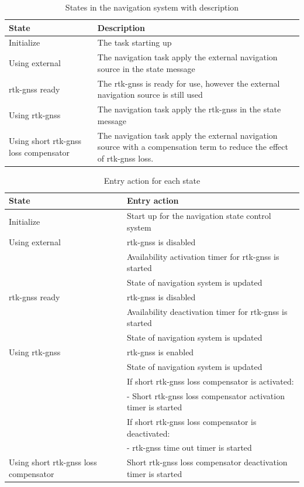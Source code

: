 \begin{table}[H]
\begin{tabular}{ | p{3cm} | p{8cm} |}
	\hline 
	\textbf{State}						& \textbf{Description} \\ \hline
	Initialize							& The task starting up\\ \hline
	Using external						& The navigation task apply the external navigation source in the state message\\ \hline
	\gls{rtk-gnss} ready							& The \gls{rtk-gnss} is ready for use, however the external navigation source is still used\\ \hline
	Using \gls{rtk-gnss}							& The navigation task apply the \gls{rtk-gnss} in the state message\\ \hline
	Using short \gls{rtk-gnss} loss compensator	& The navigation task apply the external navigation source with a compensation term to reduce the effect of \gls{rtk-gnss} loss. \\ \hline
\end{tabular}
\caption{States in the navigation system with description}
\label{Tb:StateDescription}
\end{table}

\begin{table}[H]
\begin{tabular}{ | p{3cm} | p{8cm} |}
	\hline 
	\textbf{State}						& \textbf{Entry action} 										\\ \hline
	Initialize							& Start up for the navigation state control system				\\ \hline
	Using external						& \gls{rtk-gnss} is disabled										\\
										& Availability activation timer for \gls{rtk-gnss} is started 	\\
										& State of navigation system is updated							\\ \hline
	\gls{rtk-gnss} ready							& \gls{rtk-gnss} is disabled										\\
										& Availability deactivation timer for \gls{rtk-gnss} is started	\\
										& State of navigation system is updated							\\ \hline
	Using \gls{rtk-gnss}							& \gls{rtk-gnss} is enabled										\\
										& State of navigation system is updated							\\
										& If short \gls{rtk-gnss} loss compensator is activated:					\\
										&	- Short \gls{rtk-gnss} loss compensator activation timer is started		\\
										& If short \gls{rtk-gnss} loss compensator is deactivated:					\\
										& 	- \gls{rtk-gnss} time out timer is started						\\ \hline
	Using short \gls{rtk-gnss} loss compensator	& Short \gls{rtk-gnss} loss compensator deactivation timer is started		\\ \hline
\end{tabular}
\caption{Entry action for each state}
\label{Tb:EntryAction}
\end{table}
